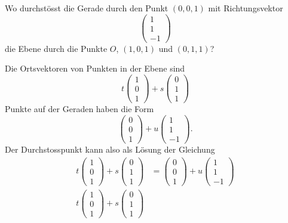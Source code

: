 Wo durchstösst die Gerade durch den Punkt $(0,0,1)$ mit Richtungsvektor
\[
\begin{pmatrix}1\\1\\-1\end{pmatrix}
\]
die Ebene durch die Punkte $O$, $(1,0,1)$ und $(0,1,1)$?


\begin{loesung}
Die Ortsvektoren von Punkten in der Ebene sind
\[
t
\begin{pmatrix}1\\0\\1\end{pmatrix}
+
s
\begin{pmatrix}0\\1\\1\end{pmatrix}
\]
Punkte auf der Geraden haben die Form
\[
\begin{pmatrix}0\\0\\1\end{pmatrix}+u\begin{pmatrix}1\\1\\-1\end{pmatrix}.
\]
Der Durchstosspunkt kann also als Lösung der Gleichung
\begin{align*}
t\begin{pmatrix}1\\0\\1\end{pmatrix}
+
s\begin{pmatrix}0\\1\\1\end{pmatrix}
&=
\begin{pmatrix}0\\0\\1\end{pmatrix}+u\begin{pmatrix}1\\1\\-1\end{pmatrix}
\\
t\begin{pmatrix}1\\0\\1\end{pmatrix}
+
s\begin{pmatrix}0\\1\\1\end{pmatrix}

\end{align*}
\end{loesung}
